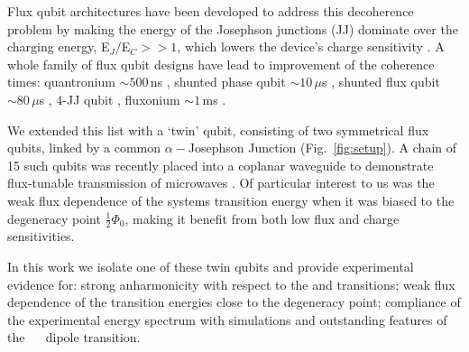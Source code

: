 Flux qubit architectures have been  developed to address this decoherence problem
by making the  energy of the Josephson junctions (JJ)  dominate over the charging
energy,  E$_J/$E$_C  >>   1$,  which  lowers  the   device's  charge  sensitivity
\cite{orlando1999,chiorescu2003,mooij1999}.  A whole family of flux qubit designs
have  lead  to  improvement  of   the  coherence  times:  quantronium  $\sim500\,$ns
\cite{cottet2002,gu2017},  shunted  phase  qubit $\sim10\,\mu  $s  \cite{stern2014}  ,
shunted  flux  qubit  $\sim80\,\mu$s   \cite{yan2016}  ,  4-JJ  qubit  \cite{qui2016},
fluxonium $\sim1\,$ms \cite{pop2014}.

We extended  this list with  a `twin' qubit,  consisting of two  symmetrical flux
qubits, linked  by a  common $  \alpha-$Josephson Junction  (Fig.~\ref{fig:setup}).  A
chain  of  15 such  qubits  was  recently placed  into  a  coplanar waveguide  to
demonstrate  flux-tunable  transmission   of  microwaves  \cite{shulga2018}.   Of
particular interest to us was the  weak flux dependence of the systems transition
energy when  it was biased to  the degeneracy point $\frac{1}{2}\Phi_0  $, making it
benefit from both low flux and charge sensitivities.
 
In  this work  we  isolate one  of  these twin  qubits  and provide  experimental
evidence for: strong anharmonicity with  respect to the \ilra{} and
\ilra{}  transitions;  weak  flux   dependence  of  the  transition
energies close  to the  degeneracy point; compliance  of the  experimental energy
spectrum with simulations and outstanding features of the ~\ilra~
dipole transition.

